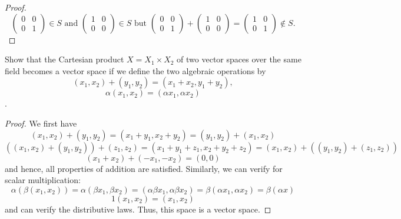 \begin{proof}
    \[\begin{pmatrix} 0 & 0 \\ 0 & 1 \end{pmatrix} \in S \text{ and } \begin{pmatrix} 1 & 0 \\ 0 & 0 \end{pmatrix} \in S \text{ but } \begin{pmatrix} 0 & 0 \\ 0 & 1 \end{pmatrix} + \begin{pmatrix} 1 & 0 \\ 0 & 0 \end{pmatrix} =  \begin{pmatrix} 1 & 0 \\ 0 & 1 \end{pmatrix} \notin S.\]
\end{proof}

\begin{question}
    Show that the Cartesian product $X = X_1 \times X_2$ of two vector spaces over the same field becomes a vector space if we define the two algebraic operations by
    \[(x_1 , x_2) + (y_1 , y_2) = (x_1 + x_2 , y_1 + y_2),\]
    \[\alpha(x_1 ,x_2) = (\alpha x_1 , \alpha x_2)\].
    \label{section2.1-13}
\end{question}
\begin{proof}
    We first have
    \[(x_1 , x_2) + (y_1 , y_2) = (x_1 + y_1 , x_2 + y_2) = (y_1 , y_2) + (x_1 ,x_2)\]
    \[((x_1 , x_2) + (y_1 , y_2)) + (z_1 , z_2) = (x_1 + y_1 + z_1 , x_2 + y_2 + z_2) = (x_1 , x_2) + ((y_1 , y_2) + (z_1 , z_2))\]
    \[(x_1 + x_2) + (-x_1 , -x_2) = (0,0)\]
    and hence, all properties of addition are satisfied.
    Similarly, we can verify for scalar multiplication:
    \[\alpha(\beta(x_1,x_2)) = \alpha(\beta x_1 , \beta x_2) = (\alpha\beta x_1 , \alpha \beta x_2) = \beta(\alpha x_1 , \alpha x_2) = \beta (\alpha x)\]
    \[1(x_1 , x_2) = (x_1 , x_2)\]
    and can verify the distributive laws. Thus, this space is a vector space.
\end{proof}

